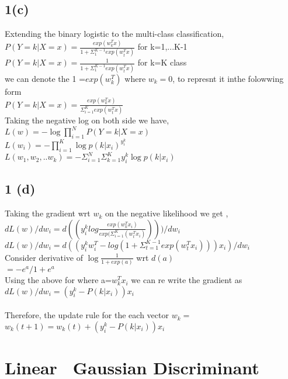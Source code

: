 \documentclass[10pt,letterpaper]{article}
\begin{document}
\subsection{1(c)} Extending the binary logistic to the multi-class classification,\\
$P(Y=k|X=x)= \frac{exp(w_k^T x)}{1+ \Sigma_1^{K-1} exp(w_t^T x)}$ for k=1,...K-1\\
$P(Y=k|X=x)= \frac{1}{1+ \Sigma_1^{K-1} exp(w_t^T x)}$ for k=K class\\

we can denote the 1 =$exp(w_k^T)$ where $w_k=0$, to represnt it inthe folowwing form \\
$P(Y=k|X=x)=\frac{exp(w_k^Tx)}{\Sigma_{i=1}^K exp(w_t^T x)}$\\

Taking the negative log on both side we have,\\

$L(w)= - \log \prod_{i=1}^N  P(Y=k|X=x)$\\
$L(w_i)= -  \prod_{i=1}^K   \log p(k |x_i)^{y_{i}^k}$\\
$L(w_1,w_2,..w_k)= -  \Sigma_{i=1}^N \Sigma_{k=1}^K  y_{i}^k \log p(k |x_i)$\\

\subsection{1 (d)}
Taking the gradient wrt $w_k$ on the negative likelihood we get ,\\
$dL(w)/d w_i =d ((y_i^k  log \frac{exp(w^T_k x_i)}{exp(\Sigma_{i=1}^K (w_t^T x_i)})) )/dw_i$\\
$dL(w)/d w_i =d ((y_i^k  w^T_i - log( 1+\Sigma_{t=1}^{K-1}exp (w_t^T x_i)))x_i )/dw_i$\\
Consider derivative of $ \log\frac{ 1}{1+ exp(a)}$  wrt  $d(a)$\\
$=-e^a / 1+ e^a$ \\
Using the above for where a=$w_k^T x_i$ we can re write the gradient as \\
	$dL(w)/d w_i =(y_i^k - P(k|x_i))x_i$\\\\
Therefore, the update rule for the each vector $w_k=$\\
	$w_k(t+1) =  w_k(t) + (y_i^k - P(k|x_i))x_i$


\section{Linear \ Gaussian Discriminant }
\end{document}
